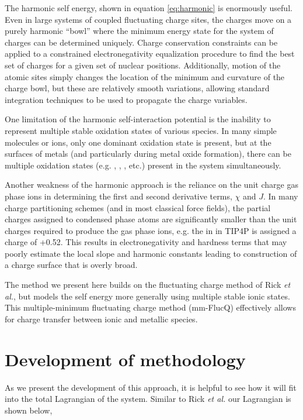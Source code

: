 The harmonic self energy, shown in equation \ref{eq:harmonic} is enormously useful.
Even in large systems of coupled fluctuating charge sites, the charges move on
a purely harmonic ``bowl'' where the minimum energy state for the system of
charges can be determined uniquely. Charge conservation constraints can be
applied to a constrained electronegativity equalization procedure to find the
best set of charges for a given set of nuclear positions.  Additionally, motion
of the atomic sites simply changes the location of the minimum and curvature of
the charge bowl, but these are relatively smooth variations, allowing standard
integration techniques to be used to propagate the charge variables.

One limitation of the harmonic self-interaction potential is the inability to
represent multiple stable oxidation states of various species. In many simple
molecules or ions, only one dominant oxidation state is present, but at the
surfaces of metals (and particularly during metal oxide formation), there can
be multiple oxidation states (e.g. , , , etc.)
present in the system simultaneously.

Another weakness of the harmonic approach is the reliance on the unit charge
gas phase ions in determining the first and second derivative terms, $\chi$ and
$J$.  In many charge partitioning schemes (and in most classical force fields),
the partial charges assigned to condensed phase atoms are significantly smaller
than the unit charges required to produce the gas phase ions, e.g. the 
in  in TIP4P is assigned a charge of +0.52.\citep{Jorgensen:1983tp}
This results in electronegativity and hardness terms that may poorly estimate the
local slope and harmonic constants leading to construction of a charge surface
that is overly broad.

The method we present here builds on the fluctuating charge method of Rick {\it
et al.}\citep{Rick:1994ss}, but models the self energy more generally using
multiple stable ionic states.  This multiple-minimum fluctuating charge method
(mm-FlucQ) effectively allows for charge transfer between ionic and metallic
species.

\section{Development of methodology}

As we present the development of this approach, it is helpful to see how it
will fit into the total Lagrangian of the system. Similar to Rick {\it et
al.}\citep{Rick:1994ss} our Lagrangian is shown below,

